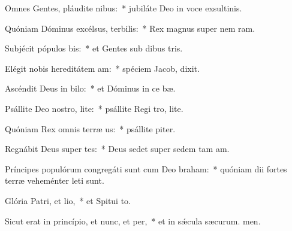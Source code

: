 \item Omnes Gentes, pláudite nibus:~* jubiláte Deo in voce exsultinis.
\item Quóniam Dóminus excélsus, terbilis:~* Rex magnus super nem ram.
\item Subjécit pópulos bis:~* et Gentes sub dibus tris.
\item Elégit nobis hereditátem am:~* spéciem Jacob,  dixit.
\item Ascéndit Deus in bilo:~* et Dóminus in ce bæ.
\item Psállite Deo nostro, lite:~* psállite Regi tro, lite.
\item Quóniam Rex omnis terræ us:~* psállite piter.
\item Regnábit Deus super tes:~* Deus sedet super sedem tam am.
\item Príncipes populórum congregáti sunt cum Deo braham:~* quóniam dii fortes terræ veheménter leti sunt.
\item Glória Patri, et lio,~* et Spitui to.
\item Sicut erat in princípio, et nunc, et per,~* et in sǽcula sæcurum. men.
